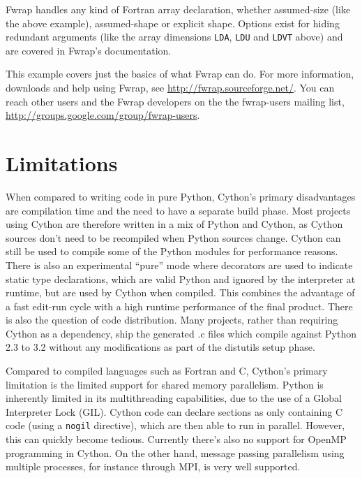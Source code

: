 \documentclass[letterpaper,11pt,english]{article}
\newcommand{\code}[1]{\texttt{#1}}
\begin{document}
Fwrap handles any kind of Fortran array declaration, whether
assumed-size (like the above example), assumed-shape or explicit
shape.  Options exist for hiding redundant arguments (like the array
dimensions \code{LDA}, \code{LDU} and \code{LDVT} above) and are covered in
Fwrap's documentation.

This example covers just the basics of what Fwrap can do.  For more
information, downloads and help using Fwrap, see
\href{http://fwrap.sourceforge.net/}{http://fwrap.sourceforge.net/}.  You can reach other users and the
Fwrap developers on the the fwrap-users mailing list,
\href{http://groups.google.com/group/fwrap-users}{http://groups.google.com/group/fwrap-users}.


\section{Limitations}

When compared to writing code in pure Python, Cython's primary
disadvantages are compilation time and the need to have a separate
build phase. Most projects using Cython are therefore written in a mix
of Python and Cython, as Cython sources don't need to be recompiled
when Python sources change. Cython can still be used to compile some
of the Python modules for performance reasons.
There is also an experimental ``pure'' mode where decorators are used to
indicate static type declarations, which are valid Python and ignored by the interpreter at runtime,
but are used by Cython when compiled.  This combines the
advantage of a fast edit-run cycle with a high runtime performance of
the final product. There is also the question of code distribution.
Many projects, rather than requiring Cython as a dependency, ship the
generated .c files which compile against Python 2.3 to 3.2 without any
modifications as part of the distutils setup phase.

Compared to compiled languages such as Fortran and C, Cython's primary
limitation is the limited support for shared memory
parallelism. Python is inherently limited in its multithreading
capabilities, due to the use of a Global Interpreter Lock
(GIL). Cython code can declare sections as only containing C code
(using a \code{nogil} directive), which are then able to run in
parallel. However, this can quickly become tedious. Currently there's
also no support for OpenMP programming in Cython. On the other hand,
message passing parallelism using multiple processes, for instance
through MPI, is very well supported.
\end{document}

